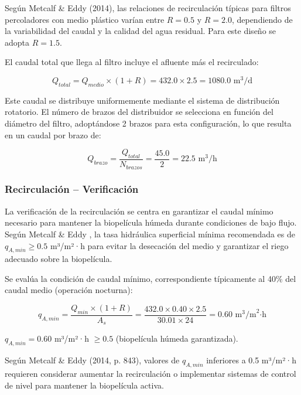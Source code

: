 \documentclass[12pt,a4paper]{article}
\begin{document}
Según Metcalf \& Eddy (2014), las relaciones de recirculación típicas para filtros percoladores con medio plástico varían entre $R = 0.5$ y $R = 2.0$, dependiendo de la variabilidad del caudal y la calidad del agua residual. Para este diseño se adopta $R = 1.5$.

El caudal total que llega al filtro incluye el afluente más el recirculado:

\begin{equation}
Q_{total} = Q_{medio} \times (1 + R) = 432.0 \times 2.5 = 1080.0 \text{ m}^3\text{/d}
\end{equation}

Este caudal se distribuye uniformemente mediante el sistema de distribución rotatorio. El número de brazos del distribuidor se selecciona en función del diámetro del filtro, adoptándose 2 brazos para esta configuración, lo que resulta en un caudal por brazo de:

\begin{equation}
Q_{brazo} = \frac{Q_{total}}{N_{brazos}} = \frac{45.0}{2} = 22.5 \text{ m}^3\text{/h}
\end{equation}

\subsubsection{Recirculación -- Verificación}

La verificación de la recirculación se centra en garantizar el caudal mínimo necesario para mantener la biopelícula húmeda durante condiciones de bajo flujo. Según Metcalf \& Eddy \cite{metcalf2014}, la tasa hidráulica superficial mínima recomendada es de $q_{A,min} \geq 0.5$ m³/m²·h para evitar la desecación del medio y garantizar el riego adecuado sobre la biopelícula.

Se evalúa la condición de caudal mínimo, correspondiente típicamente al 40\% del caudal medio (operación nocturna):

\begin{equation}
q_{A,min} = \frac{Q_{min} \times (1 + R)}{A_s} = \frac{432.0 \times 0.40 \times 2.5}{30.01 \times 24} = 0.60 \text{ m}^3\text{/m}^2\text{·h}
\end{equation}

$q_{A,min} = 0.60$ m³/m²·h $\geq 0.5$ (biopelícula húmeda garantizada).

Según Metcalf \& Eddy (2014, p. 843), valores de $q_{A,min}$ inferiores a 0.5 m³/m²·h requieren considerar aumentar la recirculación o implementar sistemas de control de nivel para mantener la biopelícula activa.
\end{document}
